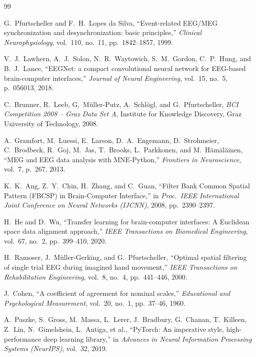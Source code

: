 \documentclass[11pt,a4paper]{article}
\begin{document}
	\newpage
	\begin{thebibliography}{99}
		
		G.~Pfurtscheller and F.~H.\ Lopes da Silva,
		``Event-related EEG/MEG synchronization and desynchronization: basic principles,''
		\emph{Clinical Neurophysiology}, vol.\ 110, no.\ 11, pp.\ 1842--1857, 1999.
		
		V.~J.\ Lawhern, A.~J.\ Solon, N.~R.\ Waytowich, S.~M.\ Gordon, C.~P.\ Hung, and B.~J.\ Lance,
		``EEGNet: a compact convolutional neural network for EEG-based brain-computer interfaces,''
		\emph{Journal of Neural Engineering}, vol.\ 15, no.\ 5, p.\ 056013, 2018.
		
		C.~Brunner, R.~Leeb, G.~M{\"u}ller-Putz, A.~Schl{\"o}gl, and G.~Pfurtscheller,
		\emph{BCI Competition 2008 -- Graz Data Set A}, Institute for Knowledge Discovery, Graz University of
		Technology, 2008.
		
		A.~Gramfort, M.~Luessi, E.~Larson, D.~A.\ Engemann, D.~Strohmeier, C.~Brodbeck, R.~Goj, M.~Jas,
		T.~Brooks, L.~Parkkonen, and M.~H{\"a}m{\"a}l{\"a}inen,
		``MEG and EEG data analysis with MNE-Python,''
		\emph{Frontiers in Neuroscience}, vol.\ 7, p.\ 267, 2013.
		
		K.~K.\ Ang, Z.~Y.\ Chin, H.~Zhang, and C.~Guan,
		``Filter Bank Common Spatial Pattern (FBCSP) in Brain-Computer Interface,''
		in \emph{Proc.\ IEEE International Joint Conference on Neural Networks (IJCNN)}, 2008, pp.\
		2390--2397.
		
		H.~He and D.~Wu,
		``Transfer learning for brain-computer interfaces: A Euclidean space data alignment approach,''
		\emph{IEEE Transactions on Biomedical Engineering}, vol.\ 67, no.\ 2, pp.\ 399--410, 2020.
		
		H.~Ramoser, J.~M{\"u}ller-Gerking, and G.~Pfurtscheller,
		``Optimal spatial filtering of single trial EEG during imagined hand movement,''
		\emph{IEEE Transactions on Rehabilitation Engineering}, vol.\ 8, no.\ 4, pp.\ 441--446, 2000.
		
		J.~Cohen,
		``A coefficient of agreement for nominal scales,''
		\emph{Educational and Psychological Measurement}, vol.\ 20, no.\ 1, pp.\ 37--46, 1960.
		
		A.~Paszke, S.~Gross, M.~Massa, L.~Lerer, J.~Bradbury, G.~Chanan, T.~Killeen, Z.~Lin, N.~Gimelshein,
		L.~Antiga, et al.,
		``PyTorch: An imperative style, high-performance deep learning library,''
		in \emph{Advances in Neural Information Processing Systems (NeurIPS)}, vol.\ 32, 2019.
		
	\end{thebibliography}
	
\end{document}
